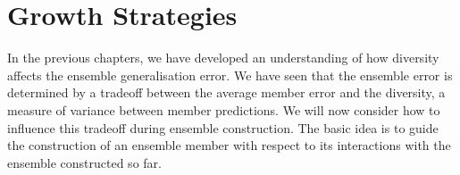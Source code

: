 \documentclass[
	twoside=false, %
]{kaobook}
\begin{document}







\chapter{Growth Strategies}




In the previous chapters, we have developed an understanding of how diversity affects the ensemble generalisation error. We have seen that the ensemble error is determined by a tradeoff between the average member error and the diversity, a measure of variance between member predictions. We will now consider how to influence this tradeoff during ensemble construction. The basic idea is to guide the construction of an ensemble member with respect to its interactions with the ensemble constructed so far.




\end{document}
